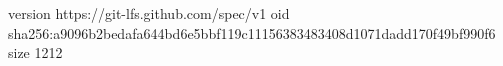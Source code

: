 version https://git-lfs.github.com/spec/v1
oid sha256:a9096b2bedafa644bd6e5bbf119c11156383483408d1071dadd170f49bf990f6
size 1212
